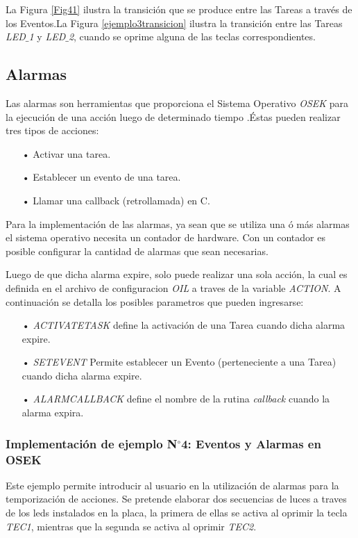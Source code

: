 \documentclass[12pt,letterpaper]{article}
\begin{document}
La Figura \ref{Fig41} ilustra la transición que se produce entre las Tareas a través de los Eventos.La Figura \ref{ejemplo3transicion} ilustra la transición entre las Tareas \textit{LED$\_$1} y \textit{LED$\_$2}, cuando se oprime alguna de las teclas correspondientes.
\subsection{Alarmas}
Las alarmas son herramientas que proporciona el Sistema Operativo \textit{OSEK} para la ejecución de una acción luego de determinado tiempo \cite{libroosekcerdeiro}.Éstas pueden realizar tres tipos de acciones:
\begin{enumerate}
\item[•]Activar una tarea.
\item[•]Establecer un evento de una tarea.
\item[•]Llamar una callback (retrollamada) en C.
\end{enumerate}
Para la implementación de las alarmas, ya sean que se utiliza una ó más alarmas el sistema operativo necesita un contador de hardware. Con un contador es posible configurar la cantidad de alarmas que sean necesarias.

Luego de que dicha alarma expire, solo puede realizar una sola acción, la cual es definida en el archivo de configuracion \textit{OIL} a traves de la variable \textit{ACTION}. A continuación se detalla los posibles parametros que pueden ingresarse:
\begin{enumerate}
\item[•]\textit{ACTIVATETASK} define la activación de una Tarea cuando dicha alarma expire.
\item[•]\textit{SETEVENT} Permite establecer un Evento (perteneciente a una Tarea) cuando dicha alarma expire.
\item[•]\textit{ALARMCALLBACK} define el nombre de la rutina \textit{callback} cuando la alarma expira.
\end{enumerate}
\subsubsection{Implementación de ejemplo N$^{\circ}$4: Eventos y Alarmas en OSEK}
Este ejemplo permite introducir al usuario en la utilización de alarmas para la temporización de acciones. Se pretende elaborar dos secuencias de luces a traves de los leds instalados en la placa, la primera de ellas se activa al oprimir la tecla \textit{TEC1}, mientras que la segunda se activa al oprimir \textit{TEC2}.
\end{document}
